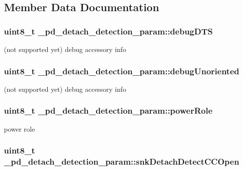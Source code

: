 \subsection{Member Data Documentation}
\hypertarget{struct__pd__detach__detection__param_ac94f35f2d29b440e1d4a221f693a877e}{
\subsubsection[{debug\-D\-T\-S}]{\setlength{\rightskip}{0pt plus 5cm}uint8\-\_\-t \-\_\-pd\-\_\-detach\-\_\-detection\-\_\-param\-::debug\-D\-T\-S}}\label{struct__pd__detach__detection__param_ac94f35f2d29b440e1d4a221f693a877e}
(not supported yet) debug accessory info \hypertarget{struct__pd__detach__detection__param_af1d9e713e2c0aa658d8b20bf641b82f8}{
\subsubsection[{debug\-Unoriented}]{\setlength{\rightskip}{0pt plus 5cm}uint8\-\_\-t \-\_\-pd\-\_\-detach\-\_\-detection\-\_\-param\-::debug\-Unoriented}}\label{struct__pd__detach__detection__param_af1d9e713e2c0aa658d8b20bf641b82f8}
(not supported yet) debug accessory info \hypertarget{struct__pd__detach__detection__param_a83d3118f26d1bd19d41aa61885fec230}{
\subsubsection[{power\-Role}]{\setlength{\rightskip}{0pt plus 5cm}uint8\-\_\-t \-\_\-pd\-\_\-detach\-\_\-detection\-\_\-param\-::power\-Role}}\label{struct__pd__detach__detection__param_a83d3118f26d1bd19d41aa61885fec230}
power role \hypertarget{struct__pd__detach__detection__param_ada72749350ff49cdeedcd58803d75d99}{
\subsubsection[{snk\-Detach\-Detect\-C\-C\-Open}]{\setlength{\rightskip}{0pt plus 5cm}uint8\-\_\-t \-\_\-pd\-\_\-detach\-\_\-detection\-\_\-param\-::snk\-Detach\-Detect\-C\-C\-Open}}\label{struct__pd__detach__detection__param_ada72749350ff49cdeedcd58803d75d99}
